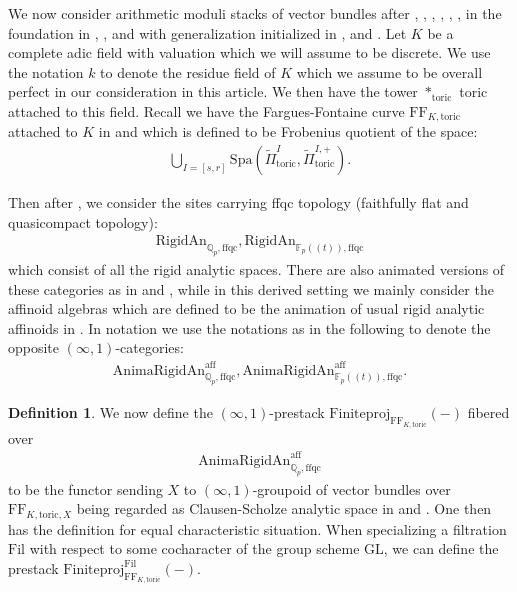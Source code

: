 \documentclass[12pt]{article}
\theoremstyle{definition}
\newtheorem{definition}[theorem]{Definition}
\numberwithin{equation}{section}
\begin{document}
\indent We now consider arithmetic moduli stacks of vector bundles after \cite{Dr}, \cite{Dr1}, \cite{He1}, \cite{PR}, \cite{EG}, \cite{EGH}, \cite{HHS} in the foundation in \cite{HP}, \cite{FF}, \cite{KL1} and \cite{KL2} with generalization initialized in \cite{KP}, \cite{T1} and \cite{T2}. Let $K$ be a complete adic field with valuation which we will assume to be discrete. We use the notation $k$ to denote the residue field of $K$ which we assume to be overall perfect in our consideration in this article. We then have the tower $*_{\mathrm{toric}}$ toric attached to this field. Recall we have the Fargues-Fontaine curve $\mathrm{FF}_{K,\mathrm{toric}}$ attached to $K$ in \cite{KL1} and \cite{KL2} which is defined to be Frobenius quotient of the space:
\begin{align}
\bigcup_{I=[s,r]}\mathrm{Spa}(\widetilde{\Pi}^I_{\mathrm{toric}},\widetilde{\Pi}_{\mathrm{toric}}^{I,+}).	
\end{align}

Then after \cite{W}, \cite{He1} we consider the sites carrying ffqc topology (faithfully flat and quasicompact topology):
\begin{align}
\mathrm{RigidAn}_{\mathbb{Q}_p,\mathrm{ffqc}},\mathrm{RigidAn}_{\mathbb{F}_p((t)),\mathrm{ffqc}}	
\end{align}
which consist of all the rigid analytic spaces. There are also animated versions of these categories as in \cite{CS1} and \cite{CS2}, while in this derived setting we mainly consider the affinoid algebras which are defined to be the animation of usual rigid analytic affinoids in \cite{Ta}. In notation we use the notations as in the following to denote the opposite $(\infty,1)$-categories:
\begin{align}
\mathrm{AnimaRigidAn}^\mathrm{aff}_{\mathbb{Q}_p,\mathrm{ffqc}},\mathrm{AnimaRigidAn}^\mathrm{aff}_{\mathbb{F}_p((t)),\mathrm{ffqc}}.	
\end{align}

\begin{definition}
We now define the $(\infty,1)$-prestack $\mathrm{Finiteproj}_{\mathrm{FF}_{K,\mathrm{toric}}}(-)$ fibered over 
\begin{align}
\mathrm{AnimaRigidAn}^\mathrm{aff}_{\mathbb{Q}_p,\mathrm{ffqc}}
\end{align}
to be the functor sending $X$ to $(\infty,1)$-groupoid of vector bundles over $\mathrm{FF}_{K,\mathrm{toric},X}$ being regarded as Clausen-Scholze analytic space in \cite{CS1} and \cite{CS2}. One then has the definition for equal characteristic situation. When specializing a filtration $\mathrm{Fil}$ with respect to some cocharacter of the group scheme $\mathrm{GL}$, we can define the prestack $\mathrm{Finiteproj}^{\mathrm{Fil}}_{\mathrm{FF}_{K,\mathrm{toric}}}(-)$.
\end{definition}
\end{document}
